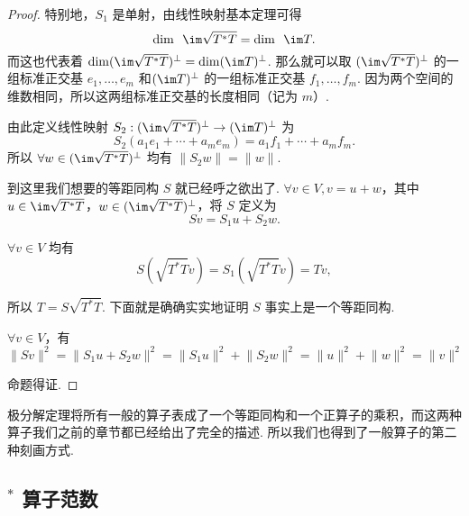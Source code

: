 \begin{proof}
    特别地，$ S_1 $ 是单射，由线性映射基本定理可得
    \[ \dim \enspace \im \sqrt{T^*T} = \dim \enspace \im T. \]
    而这也代表着 $ \dim(\im \sqrt{T^*T})^{\perp} = \dim(\im T)^{\perp} $. 那么就可以取 $ (\im \sqrt{T^*T})^{\perp} $ 的一组标准正交基 $ e_1, \ldots , e_m $ 和$ (\im T)^{\perp} $ 的一组标准正交基 $ f_1, \ldots, f_m $. 因为两个空间的维数相同，所以这两组标准正交基的长度相同（记为 $ m $）.

    由此定义线性映射 $ S_2: (\im \sqrt{T^*T})^{\perp} \rightarrow (\im T)^{\perp} $ 为
    \[ S_2(a_1e_1 + \cdots + a_me_m) = a_1f_1 + \cdots + a_mf_m. \]
    所以 $ \forall w \in (\im \sqrt{T^*T})^{\perp} $ 均有 $ \lVert S_2w \rVert = \lVert w \rVert $.

    到这里我们想要的等距同构 $ S $ 就已经呼之欲出了. $ \forall v \in V, v = u + w $，其中 $ u \in \im \sqrt{T^*T} $，$ w \in (\im \sqrt{T^*T})^{\perp} $，将 $ S $ 定义为
    \[ Sv = S_1u + S_2w. \]

    $ \forall v \in V $ 均有
    \[ S(\sqrt{T^*T}v) = S_1(\sqrt{T^*T}v) = Tv, \]

    所以 $ T = S\sqrt{T^*T} $. 下面就是确确实实地证明 $ S $ 事实上是一个等距同构.

    $ \forall v \in V $，有
    \[ \lVert Sv \rVert^2 = \lVert S_1u + S_2w \rVert^2     = \lVert S_1u \rVert^2 + \lVert S_2w \rVert^2 = \lVert u \rVert^2 + \lVert w \rVert^2 = \lVert v \rVert^2 \]

    命题得证.
\end{proof}

极分解定理将所有一般的算子表成了一个等距同构和一个正算子的乘积，而这两种算子我们之前的章节都已经给出了完全的描述. 所以我们也得到了一般算子的第二种刻画方式.

\subsection*{$^*$ 算子范数}

\begin{summary}

\end{summary}

\begin{exercise}

    \begin{exgroup}
        \item
    \end{exgroup}

    \begin{exgroup}
        \item
    \end{exgroup}

    \begin{exgroup}
        \item
    \end{exgroup}
\end{exercise}
